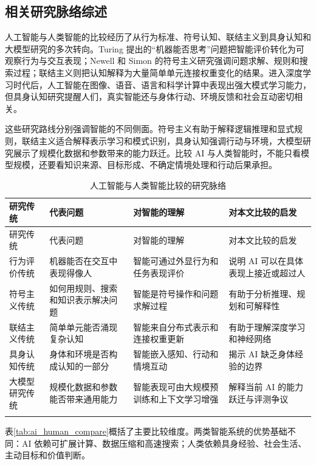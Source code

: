 \documentclass[UTF8,zihao=5,a4paper]{ctexart}
\begin{document}
\subsection{相关研究脉络综述}

人工智能与人类智能的比较经历了从行为标准、符号认知、联结主义到具身认知和大模型研究的多次转向。Turing 提出的“机器能否思考”问题把智能评价转化为可观察行为与交互表现\cite{turing1950computing}；Newell 和 Simon 的符号主义研究强调问题求解、规则和搜索过程\cite{newell1972human}；联结主义则把认知解释为大量简单单元连接权重变化的结果。进入深度学习时代后，人工智能在图像、语音、语言和科学计算中表现出强大模式学习能力，但具身认知研究提醒人们，真实智能还与身体行动、环境反馈和社会互动密切相关\cite{varela1991embodied,clark1997being}。

这些研究路线分别强调智能的不同侧面。符号主义有助于解释逻辑推理和显式规则，联结主义适合解释表示学习和模式识别，具身认知强调行动与环境，大模型研究展示了规模化数据和参数带来的能力跃迁。比较 AI 与人类智能时，不能只看模型规模，还要看知识来源、目标形成、不确定情境处理和行动后果承担。

\begin{longtable}{p{2.8cm}p{3.0cm}p{4.2cm}p{4.0cm}}
\toprule
研究传统 & 代表问题 & 对智能的理解 & 对本文比较的启发 \\
\midrule
\endfirsthead
\toprule
研究传统 & 代表问题 & 对智能的理解 & 对本文比较的启发 \\
\midrule
\endhead
行为评价传统 & 机器能否在交互中表现得像人 & 智能可通过外显行为和任务表现评价 & 说明 AI 可以在具体表现上接近或超过人 \\
符号主义传统 & 如何用规则、搜索和知识表示解决问题 & 智能是符号操作和问题求解过程 & 有助于分析推理、规划和可解释性 \\
联结主义传统 & 简单单元能否涌现复杂认知 & 智能来自分布式表示和连接权重更新 & 有助于理解深度学习和神经网络 \\
具身认知传统 & 身体和环境是否构成认知的一部分 & 智能嵌入感知、行动和情境互动 & 揭示 AI 缺乏身体经验的边界 \\
大模型研究传统 & 规模化数据和参数能否带来通用能力 & 智能表现可由大规模预训练和上下文学习增强 & 解释当前 AI 的能力跃迁与评测争议 \\
\bottomrule
\caption{人工智能与人类智能比较的研究脉络}
\label{tab:ai_human_literature}\\
\end{longtable}

表\ref{tab:ai_human_compare}概括了主要比较维度。两类智能系统的优势基础不同：AI 依赖可扩展计算、数据压缩和高速搜索；人类依赖具身经验、社会生活、主动目标和价值判断。
\end{document}

